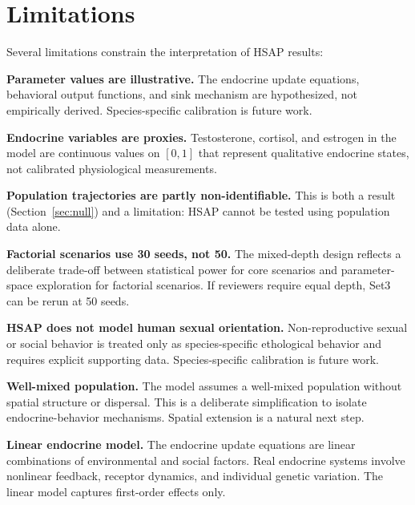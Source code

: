 \section{Limitations}

Several limitations constrain the interpretation of HSAP results:

\textbf{Parameter values are illustrative.} The endocrine update equations, behavioral output functions, and sink mechanism are hypothesized, not empirically derived. Species-specific calibration is future work.

\textbf{Endocrine variables are proxies.} Testosterone, cortisol, and estrogen in the model are continuous values on $[0, 1]$ that represent qualitative endocrine states, not calibrated physiological measurements.

\textbf{Population trajectories are partly non-identifiable.} This is both a result (Section~\ref{sec:null}) and a limitation: HSAP cannot be tested using population data alone.

\textbf{Factorial scenarios use 30 seeds, not 50.} The mixed-depth design reflects a deliberate trade-off between statistical power for core scenarios and parameter-space exploration for factorial scenarios. If reviewers require equal depth, Set3 can be rerun at 50 seeds.

\textbf{HSAP does not model human sexual orientation.} Non-reproductive sexual or social behavior is treated only as species-specific ethological behavior and requires explicit supporting data. Species-specific calibration is future work.

\textbf{Well-mixed population.} The model assumes a well-mixed population without spatial structure or dispersal. This is a deliberate simplification to isolate endocrine-behavior mechanisms. Spatial extension is a natural next step.

\textbf{Linear endocrine model.} The endocrine update equations are linear combinations of environmental and social factors. Real endocrine systems involve nonlinear feedback, receptor dynamics, and individual genetic variation. The linear model captures first-order effects only.

